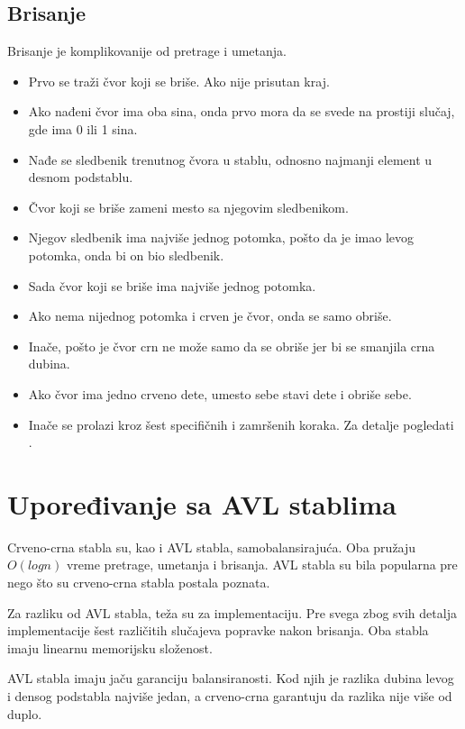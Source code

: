 \documentclass[a4paper]{article}
\begin{document}
\subsection{Brisanje}
Brisanje je komplikovanije od pretrage i umetanja.

\begin{itemize}
    \item Prvo se traži čvor koji se briše. Ako nije prisutan kraj.
    \item Ako nađeni čvor ima oba sina, onda prvo mora da se svede na prostiji slučaj, gde ima 0 ili 1 sina.
    \item Nađe se sledbenik trenutnog čvora u stablu, odnosno najmanji element u desnom podstablu.
    \item Čvor koji se briše zameni mesto sa njegovim sledbenikom.
    \item Njegov sledbenik ima najviše jednog potomka, pošto da je imao levog potomka, onda bi on bio sledbenik.
    \item Sada čvor koji se briše ima najviše jednog potomka. 
    \item Ako nema nijednog potomka i crven je čvor, onda se samo obriše.
    \item Inače, pošto je čvor crn ne može samo da se obriše jer bi se smanjila crna dubina.
    \item Ako čvor ima jedno crveno dete, umesto sebe stavi dete i obriše sebe.
    \item Inače se prolazi kroz šest specifičnih i zamršenih koraka. Za detalje pogledati \cite{cases}.
\end{itemize}


\section{Upoređivanje sa AVL stablima}
    Crveno-crna stabla su, kao i AVL stabla, samobalansirajuća. Oba pružaju $O(log n)$ vreme pretrage, umetanja i brisanja.
    AVL stabla su bila popularna pre nego što su crveno-crna stabla postala poznata.

    Za razliku od AVL stabla, teža su za implementaciju. Pre svega zbog svih detalja implementacije šest različitih slučajeva 
    popravke nakon brisanja.
    Oba stabla imaju linearnu memorijsku složenost.

    AVL stabla imaju jaču garanciju balansiranosti. Kod njih je razlika dubina levog i densog podstabla najviše jedan, a crveno-crna garantuju da razlika nije više od duplo.
\end{document}
